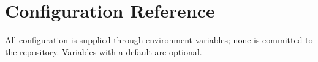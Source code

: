 \chapter{Configuration Reference}\label{app:configuration}

All configuration is supplied through environment variables; none is committed to the repository. Variables
with a default are optional.

